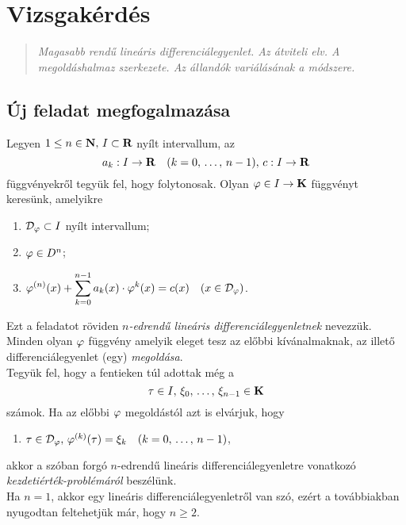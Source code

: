 \newpage
\section{Vizsgakérdés}
\begin{quote}
	\textit{Magasabb rendű lineáris differenciálegyenlet. Az átviteli elv. A megoldáshalmaz szerkezete. Az állandók variálásának a módszere.}
\end{quote}

\subsection{Új feladat megfogalmazása}
Legyen $1 \leq n \in \mathbf{N}, \, I \subset \mathbf{R}$ nyílt intervallum, az
\[
	a_k : I \to \mathbf{R} \quad (k = 0, \, \dots, \, n-1), \, c: I \to \mathbf{R}
\]
függvényekről tegyük fel, hogy folytonosak. Olyan $\varphi \in I \to \mathbf{K}$ függvényt keresünk, amelyikre
\begin{enumerate}
	\item $\mathcal{D}_\varphi \subset I$ nyílt intervallum;
	\item $\varphi \in D^n$;
	\item $\displaystyle \varphi^{(n)}(x) + \sum_{k=0}^{n-1} a_k(x) \cdot \varphi^{k}(x) = c(x) \quad (x \in \mathcal{D}_\varphi)$.
\end{enumerate}
Ezt a feladatot röviden \textit{$n$-edrendű lineáris differenciálegyenletnek} nevezzük. Minden olyan $\varphi$ függvény amelyik eleget tesz az előbbi kívánalmaknak, az illető differenciálegyenlet (egy) \textit{megoldása}.\\

Tegyük fel, hogy a fentieken túl adottak még a
\[
	\tau \in I, \, \xi_0, \, \dots, \, \xi_{n-1} \in \mathbf{K}
\]
számok. Ha az előbbi $\varphi$ megoldástól azt is elvárjuk, hogy
\begin{enumerate}[start=4]
	\item $\tau \in \mathcal{D}_\varphi, \, \varphi^{(k)}(\tau) = \xi_k \quad (k = 0, \, \dots, \, n-1)$,
\end{enumerate}
akkor a szóban forgó $n$-edrendű lineáris differenciálegyenletre vonatkozó \textit{kezdetiérték-problémáról} beszélünk.\\

Ha $n=1$, akkor egy lineáris differenciálegyenletről van szó, ezért a továbbiakban nyugodtan feltehetjük már, hogy $n \geq 2$.\\

